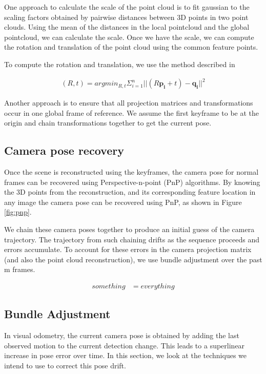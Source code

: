 \documentclass{article}
\begin{document}
One approach to calculate the scale of the point cloud is to fit gaussian to the scaling factors obtained by pairwise distances between 3D points in two point clouds. Using the mean of the distances in the local pointcloud and the global pointcloud, we can calculate the scale. Once we have the scale, we can compute the rotation and translation of the point cloud using the common feature points.

To compute the rotation and translation, we use the method described in \citep{rigidbody}

\begin{align*}
    (R, t) = argmin_{R, t} \Sigma_{i=1}^n || (R \mathbf{p_i} + t ) - \mathbf{q_i}||^2 
\end{align*}

Another approach is to ensure that all projection matrices and transformations occur in one global frame of reference. We assume the first keyframe to be at the origin and chain transformations together to get the current pose.

\subsection{Camera pose recovery}
Once the scene is reconstructed using the keyframes, the camera pose for normal frames can be recovered using Perspective-n-point (PnP) algorithms. By knowing the 3D points from the reconstruction, and its corresponding feature location in any image the camera pose can be recovered using PnP, as shown in Figure \ref{fig:pnp}.

We chain these camera poses together to produce an initial guess of the camera trajectory. The trajectory from such chaining drifts as the sequence proceeds and errors accumulate. To account for these errors in the camera projection matrix (and also the point cloud reconstruction), we use bundle adjustment over the past m frames.

\begin{align*}
    something &= everything
\end{align*}

\subsection{Bundle Adjustment}
In visual odometry, the current camera pose is obtained by adding the last observed motion to the current detection change. This leads to a superlinear increase in pose error over time. In this section, we look at the techniques we intend to use to correct this pose drift.
\end{document}
